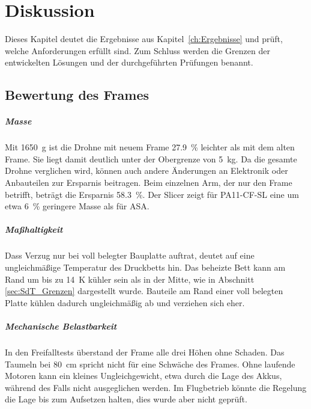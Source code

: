 \chapter{Diskussion}
\label{ch:Diskussion}

Dieses Kapitel deutet die Ergebnisse aus Kapitel~\ref{ch:Ergebnisse} und prüft, welche Anforderungen erfüllt sind. Zum Schluss werden die Grenzen der entwickelten Lösungen und der durchgeführten Prüfungen benannt.

    \section{Bewertung des Frames}
    \label{sec:Diskussion_Frame}

    \paragraph{Masse}
    Mit \SI{1650}{\gram} ist die Drohne mit neuem Frame \SI{27,9}{\percent} leichter als mit dem alten Frame. Sie liegt damit deutlich unter der Obergrenze von \SI{5}{\kilo\gram}. Da die gesamte Drohne verglichen wird, können auch andere Änderungen an Elektronik oder Anbauteilen zur Ersparnis beitragen. Beim einzelnen Arm, der nur den Frame betrifft, beträgt die Ersparnis \SI{58,3}{\percent}. Der Slicer zeigt für PA11-CF-SL eine um etwa \SI{6}{\percent} geringere Masse als für ASA.

    \paragraph{Maßhaltigkeit}
    Dass Verzug nur bei voll belegter Bauplatte auftrat, deutet auf eine ungleichmäßige Temperatur des Druckbetts hin. Das beheizte Bett kann am Rand um bis zu \SI{14}{\kelvin} kühler sein als in der Mitte, wie in Abschnitt \ref{sec:SdT_Grenzen} dargestellt wurde. Bauteile am Rand einer voll belegten Platte kühlen dadurch ungleichmäßig ab und verziehen sich eher.

    \paragraph{Mechanische Belastbarkeit}
    In den Freifalltests überstand der Frame alle drei Höhen ohne Schaden. Das Taumeln bei \SI{80}{\centi\metre} spricht nicht für eine Schwäche des Frames. Ohne laufende Motoren kann ein kleines Ungleichgewicht, etwa durch die Lage des Akkus, während des Falls nicht ausgeglichen werden. Im Flugbetrieb könnte die Regelung die Lage bis zum Aufsetzen halten, dies wurde aber nicht geprüft.

